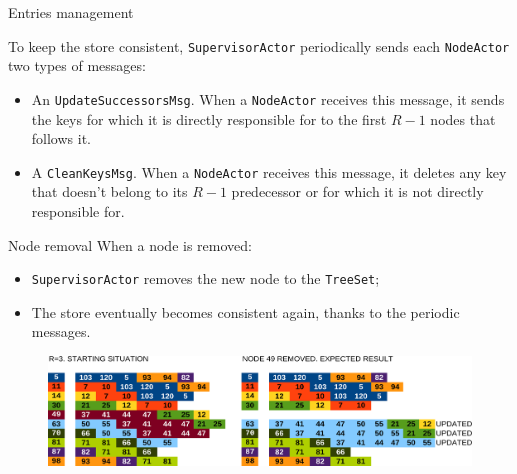 \documentclass{beamer}
\begin{document}
\begin{frame}{Entries management} \justify
    
    To keep the store consistent, \texttt{SupervisorActor} periodically sends each \texttt{NodeActor} two types of messages: 

    \begin{itemize}[label=$\bullet$]
        \item An \texttt{UpdateSuccessorsMsg}. When a \texttt{NodeActor} receives this message, it sends the keys for which it is directly responsible for to the first $R-1$ nodes that follows it.
        \item A \texttt{CleanKeysMsg}. When a \texttt{NodeActor} receives this message, it deletes any key that doesn't belong to its $R-1$ predecessor or for which it is not directly responsible for.
    \end{itemize}

\end{frame}

\begin{frame}{Node removal} \justify
    When a node is removed:

    \begin{itemize}[label=$\bullet$]
        \item \texttt{SupervisorActor} removes the new node to the \texttt{TreeSet};
        \item The store eventually becomes consistent again, thanks to the periodic messages.
    \end{itemize}

    \begin{figure}
        \includegraphics[width=\linewidth]{02-NodeRemoved.png}
    \end{figure}
\end{frame}
\end{document}
